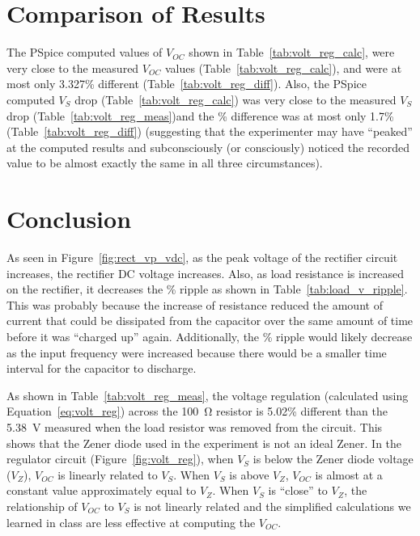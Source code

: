 \documentclass{article}
\begin{document}
\section{Comparison of Results}
\label{sec:comp_of_res}

The PSpice computed values of $V_{OC}$ shown in Table~\ref{tab:volt_reg_calc}, were very close to the measured $V_{OC}$ values (Table~\ref{tab:volt_reg_calc}), and were at most only 3.327\% different (Table~\ref{tab:volt_reg_diff}).  Also, the PSpice computed $V_S$ drop (Table~\ref{tab:volt_reg_calc}) was very close to the measured $V_S$ drop (Table~\ref{tab:volt_reg_meas})and the \% difference was at most only 1.7\% (Table~\ref{tab:volt_reg_diff}) (suggesting that the experimenter may have “peaked” at the computed results and subconsciously (or consciously) noticed the recorded value to be almost exactly the same in all three circumstances).

\section{Conclusion}
\label{sec:conclusion}

As seen in Figure~\ref{fig:rect_vp_vdc}, as the peak voltage of the rectifier circuit increases, the rectifier DC voltage increases.  Also, as load resistance is increased on the rectifier, it decreases the \% ripple as shown in Table~\ref{tab:load_v_ripple}.  This was probably because the increase of resistance reduced the amount of current that could be dissipated from the capacitor over the same amount of time before it was “charged up” again.  Additionally, the \% ripple would likely decrease as the input frequency were increased because there would be a smaller time interval for the capacitor to discharge.

As shown in Table~\ref{tab:volt_reg_meas}, the voltage regulation (calculated using Equation~\ref{eq:volt_reg}) across the \SI{100}{\ohm} resistor is 5.02\% different than the \SI{5.38}{V} measured when the load resistor was removed from the circuit. This shows that the Zener diode used in the experiment is not an ideal Zener. In the regulator circuit (Figure~\ref{fig:volt_reg}), when $V_S$ is below the Zener diode voltage ($V_Z$), $V_{OC}$ is linearly related to $V_S$. When $V_S$ is above $V_Z$, $V_{OC}$ is almost at a constant value approximately equal to $V_Z$. When $V_S$ is “close” to $V_Z$, the relationship of $V_{OC}$ to $V_S$ is not linearly related and the simplified calculations we learned in class are less effective at computing the $V_{OC}$.
\end{document}
